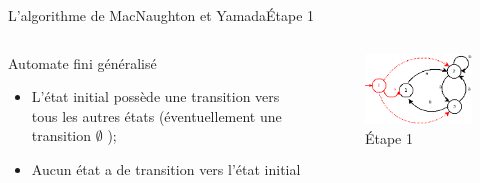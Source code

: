 \documentclass{beamer}
\begin{document}
\begin{frame}{L'algorithme de MacNaughton et Yamada}{Étape 1}
     \begin{columns}[T]
     \begin{column}{.48\textwidth}
         {\fontsize{8}{9}\selectfont Automate fini généralisé}
         \begin{itemize}
         
             \item {\fontsize{7}{8}\selectfont L'état initial possède une transition vers tous les autres états (éventuellement une transition $\emptyset$ );}
             \item {\fontsize{7}{8}\selectfont Aucun état a de transition vers l'état initial}

         \end{itemize}
     \end{column}
     
     \begin{column}{.48\textwidth}
     \begin{figure}
     \includegraphics[scale=0.37]{Diagramme2_2.png}
     \centering
     \caption{Étape 1}     
     \end{figure}
     \end{column}
        
     \end{columns}

\end{frame}
\end{document}
